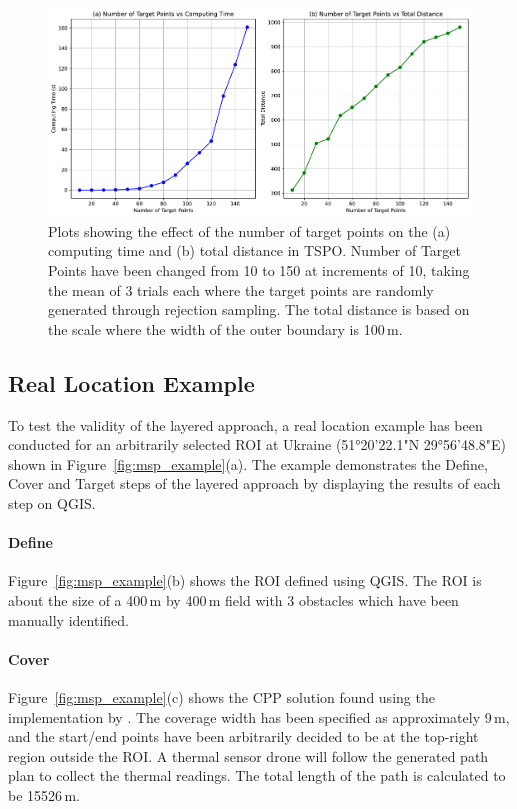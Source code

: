 \begin{figure}[h!]
    \centering
    \includegraphics[width=\linewidth]{figs/Jihwan/target_points_vs.pdf}
    \caption[Effect of Number of Target Points on Computing Time and Total Distance of TSP-O Solution]
    {Plots showing the effect of the number of target points on the (a) computing time and (b) total distance in \gls{TSPO}. Number of Target Points have been changed from 10 to 150 at increments of 10, taking the mean of 3 trials each where the target points are randomly generated through rejection sampling. The total distance is based on the scale where the width of the outer boundary is 100\,m.}
    \label{fig:msp_tspo_plot}
\end{figure}

\subsection{Real Location Example}
\label{sec:msp_example}

To test the validity of the layered approach, a real location example has been conducted for an arbitrarily selected \gls{ROI} at Ukraine (51°20'22.1"N 29°56'48.8"E) shown in Figure~\ref{fig:msp_example}(a). The example demonstrates the Define, Cover and Target steps of the layered approach by displaying the results of each step on \gls{QGIS}. 

\paragraph{Define} Figure~\ref{fig:msp_example}(b) shows the \gls{ROI} defined using \gls{QGIS}. The \gls{ROI} is about the size of a 400\,m by 400\,m field with 3 obstacles which have been manually identified.  

\paragraph{Cover} Figure~\ref{fig:msp_example}(c) shows the \gls{CPP} solution found using the implementation by \cite{bahnemann2021cpp}. The coverage width has been specified as approximately 9\,m, and the start/end points have been arbitrarily decided to be at the top-right region outside the \gls{ROI}. A thermal sensor drone will follow the generated path plan to collect the thermal readings. The total length of the path is calculated to be 15526\,m.

